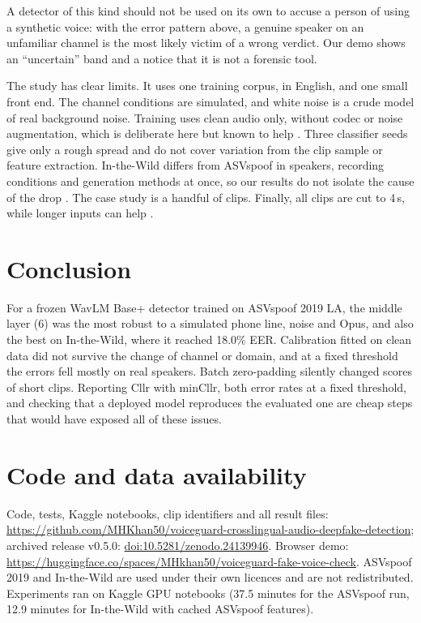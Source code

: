 \documentclass[10pt,a4paper]{article}
\begin{document}
A detector of this kind should not be used on its own to accuse a person of using a synthetic voice: with the error pattern above, a genuine speaker on an unfamiliar channel is the most likely victim of a wrong verdict. Our demo shows an ``uncertain'' band and a notice that it is not a forensic tool.

The study has clear limits. It uses one training corpus, in English, and one small front end. The channel conditions
are simulated, and white noise is a crude model of real background noise. Training uses clean audio only, without
codec or noise augmentation, which is deliberate here but known to help \cite{tak2022automatic}. Three classifier
seeds give only a rough spread and do not cover variation from the clip sample or feature extraction. In-the-Wild
differs from ASVspoof in speakers, recording conditions and generation methods at once, so our results do not
isolate the cause of the drop \cite{muller2024harder}. The case study is a handful of clips. Finally, all clips are
cut to 4\,s, while longer inputs can help \cite{muller2022does}.

\section{Conclusion}
For a frozen WavLM Base+ detector trained on ASVspoof 2019 LA, the middle layer (6) was the most robust to a
simulated phone line, noise and Opus, and also the best on In-the-Wild, where it reached 18.0\% EER. Calibration
fitted on clean data did not survive the change of channel or domain, and at a fixed threshold the errors fell mostly
on real speakers. Batch zero-padding silently changed scores of short clips. Reporting Cllr with minCllr, both error
rates at a fixed threshold, and checking that a deployed model reproduces the evaluated one are cheap steps that
would have exposed all of these issues.

\section*{Code and data availability}
Code, tests, Kaggle notebooks, clip identifiers and all result files:
\url{https://github.com/MHKhan50/voiceguard-crosslingual-audio-deepfake-detection}; archived release v0.5.0: \href{https://doi.org/10.5281/zenodo.24139946}{doi:10.5281/zenodo.24139946}. Browser demo:
\url{https://huggingface.co/spaces/MHkhan50/voiceguard-fake-voice-check}. ASVspoof 2019 and In-the-Wild are used
under their own licences and are not redistributed. Experiments ran on Kaggle GPU notebooks (37.5 minutes for the
ASVspoof run, 12.9 minutes for In-the-Wild with cached ASVspoof features).



\end{document}
